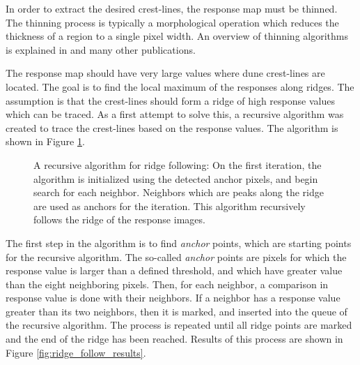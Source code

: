 In order to extract the desired crest-lines, the response map must be thinned. The thinning process is typically a morphological operation which reduces the thickness of a region to a single pixel width. An overview of thinning algorithms is explained in \cite{thinning-algorithms,performance-characterization-thinning,susan-new-approach-low-level-image-processing} and many other publications.

The response map should have very large values where dune crest-lines are located. The goal is to find the local maximum of the responses along ridges. The assumption is that the crest-lines should form a ridge of high response values which can be traced. As a first attempt to solve this, a recursive algorithm was created to trace the crest-lines based on the response values. The algorithm is shown in Figure \ref{fig:recursive_ridge_follow}.

\begin{figure}
	\centering
	\caption{A recursive algorithm for ridge following: On the first iteration, the algorithm is initialized using the detected anchor pixels, and begin search for each neighbor. Neighbors which are peaks along the ridge are used as anchors for the iteration. This algorithm recursively follows the ridge of the response images.}
	\label{fig:recursive_ridge_follow}
\end{figure}

The first step in the algorithm is to find \emph{anchor} points, which are starting points for the recursive algorithm. The so-called \emph{anchor} points are pixels for which the response value is larger than a defined threshold, and which have greater value than the eight neighboring pixels. Then, for each neighbor, a comparison in response value is done with their neighbors. If a neighbor has a response value greater than its two neighbors, then it is marked, and inserted into the queue of the recursive algorithm. The process is repeated until all ridge points are marked and the end of the ridge has been reached. Results of this process are shown in Figure \ref{fig:ridge_follow_results}.


